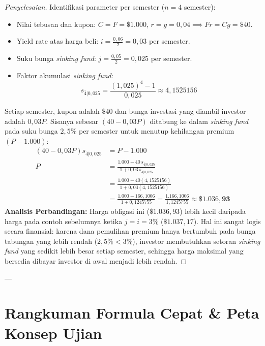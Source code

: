 \documentclass[11pt,a4paper]{article}
\begin{document}
\begin{proof}[Penyelesaian]
Identifikasi parameter per semester ($n = 4$ semester):
\begin{itemize}
    \item Nilai tebusan dan kupon: $C = F = \$1.000$, $r = g = 0{,}04 \implies Fr = Cg = \$40$.
    \item Yield rate atas harga beli: $i = \frac{0{,}06}{2} = 0{,}03$ per semester.
    \item Suku bunga \textit{sinking fund}: $j = \frac{0{,}05}{2} = 0{,}025$ per semester.
    \item Faktor akumulasi \textit{sinking fund}:
    \begin{equation*}
        s_{\overline{4}|0{,}025} = \frac{(1{,}025)^4 - 1}{0{,}025} \approx 4{,}1525156
    \end{equation*}
\end{itemize}
Setiap semester, kupon adalah $\$40$ dan bunga investasi yang diambil investor adalah $0{,}03 P$. Sisanya sebesar $(40 - 0{,}03 P)$ ditabung ke dalam \textit{sinking fund} pada suku bunga $2{,}5\%$ per semester untuk menutup kehilangan premium $(P - 1.000)$:
\begin{align*}
    (40 - 0{,}03 P) s_{\overline{4}|0{,}025} &= P - 1.000 \\
    P &= \frac{1.000 + 40 \, s_{\overline{4}|0{,}025}}{1 + 0{,}03 \, s_{\overline{4}|0{,}025}} \\
    &= \frac{1.000 + 40(4{,}1525156)}{1 + 0{,}03(4{,}1525156)} \\
    &= \frac{1.000 + 166{,}1006}{1 + 0{,}1245755} = \frac{1.166{,}1006}{1{,}1245755} \approx \mathbf{\$1.036{,}93}
\end{align*}
\textbf{Analisis Perbandingan:} Harga obligasi ini ($\$1.036{,}93$) lebih kecil daripada harga pada contoh sebelumnya ketika $j = i = 3\%$ ($\$1.037{,}17$). Hal ini sangat logis secara finansial: karena dana pemulihan premium hanya bertumbuh pada bunga tabungan yang lebih rendah ($2{,}5\% < 3\%$), investor membutuhkan setoran \textit{sinking fund} yang sedikit lebih besar setiap semester, sehingga harga maksimal yang bersedia dibayar investor di awal menjadi lebih rendah.
\end{proof}

---

\section{Rangkuman Formula Cepat \& Peta Konsep Ujian}
\end{document}
